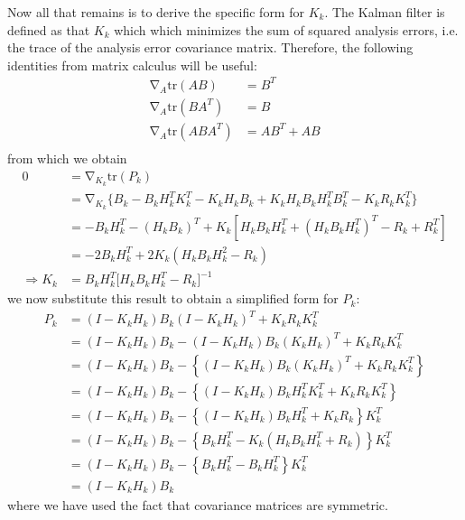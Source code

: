 Now all that remains is to derive the specific form for $K_k$. The Kalman filter is defined as that $K_k$ which which minimizes the sum of squared analysis errors, i.e. the trace of the analysis error covariance matrix. Therefore, the following identities from matrix calculus will be useful:
\begin{align}
    \mathop{\nabla}_{A}\text{tr}(AB) &= B^T \\
    \mathop{\nabla}_{A}\text{tr}(BA^T) &= B \\
    \mathop{\nabla}_{A}\text{tr}(ABA^T) &= AB^T + AB  \\
\end{align}
from which we obtain
\begin{align}
    0 &= \mathop{\nabla}_{K_k}\text{tr}(P_k) \\
      &= \mathop{\nabla}_{K_k}\Big\{ B_k -B_kH_k^TK_k^T - K_kH_kB_k  + K_kH_kB_kH_k^TB_k^T - K_kR_kK_k^T \Big\} \\
      &= -B_kH_k^T - (H_kB_k)^T + K_k\left[H_kB_kH_k^T + (H_kB_kH_k^T)^T - R_k+R_k^T\right] \\
      &= -2B_kH_k^T + 2K_k\left(H_kB_kH_k^2 - R_k \right) \\
  \Rightarrow K_k &= B_kH_k^T\Big[ H_kB_kH_k^T - R_k \Big]^{-1}
\end{align}
we now substitute this result to obtain a simplified form for $P_k$:
\begin{align}
    P_k &= \left(I - K_kH_k \right)B_k\left(I - K_kH_k \right)^T + K_kR_kK_k^T \\
        &= \left(I - K_kH_k \right)B_k - \left(I - K_kH_k \right)B_k\left(K_kH_k \right)^T + K_kR_kK_k^T \\
        &= \left(I - K_kH_k \right)B_k -\left\{ \left(I - K_kH_k \right)B_k\left(K_kH_k \right)^T + K_kR_kK_k^T \right\} \\
        &= \left(I - K_kH_k \right)B_k -\left\{ \left(I - K_kH_k \right)B_kH_k^TK_k^T + K_kR_kK_k^T \right\} \\
        &= \left(I - K_kH_k \right)B_k -\left\{ \left(I - K_kH_k \right)B_kH_k^T + K_kR_k \right\}K_k^T \\
        &= \left(I - K_kH_k \right)B_k -\left\{ B_kH_k^T - K_k\left( H_kB_kH_k^T + R_k \right)  \right\}K_k^T \\
        &= \left(I - K_kH_k \right)B_k -\left\{ B_kH_k^T - B_kH_k^T \right\}K_k^T \\
        &= \left(I - K_kH_k \right)B_k
\end{align}
where we have used the fact that covariance matrices are symmetric.


